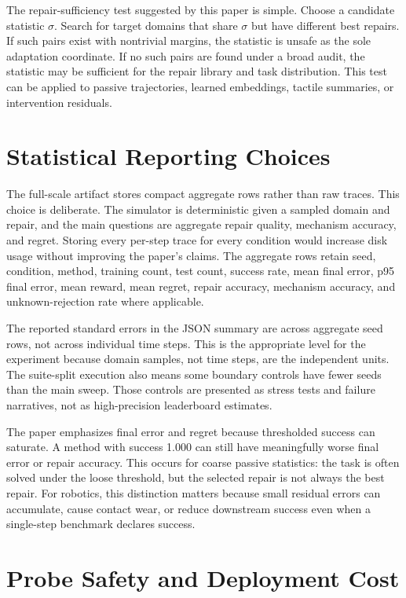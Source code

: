 \documentclass{article}
\begin{document}
The repair-sufficiency test suggested by this paper is simple. Choose a
candidate statistic $\sigma$. Search for target domains that share $\sigma$ but
have different best repairs. If such pairs exist with nontrivial margins, the
statistic is unsafe as the sole adaptation coordinate. If no such pairs are
found under a broad audit, the statistic may be sufficient for the repair
library and task distribution. This test can be applied to passive trajectories,
learned embeddings, tactile summaries, or intervention residuals.

\section{Statistical Reporting Choices}

The full-scale artifact stores compact aggregate rows rather than raw traces.
This choice is deliberate. The simulator is deterministic given a sampled domain
and repair, and the main questions are aggregate repair quality, mechanism
accuracy, and regret. Storing every per-step trace for every condition would
increase disk usage without improving the paper's claims. The aggregate rows
retain seed, condition, method, training count, test count, success rate, mean
final error, p95 final error, mean reward, mean regret, repair accuracy,
mechanism accuracy, and unknown-rejection rate where applicable.

The reported standard errors in the JSON summary are across aggregate seed rows,
not across individual time steps. This is the appropriate level for the
experiment because domain samples, not time steps, are the independent units.
The suite-split execution also means some boundary controls have fewer seeds
than the main sweep. Those controls are presented as stress tests and failure
narratives, not as high-precision leaderboard estimates.

The paper emphasizes final error and regret because thresholded success can
saturate. A method with success 1.000 can still have meaningfully worse final
error or repair accuracy. This occurs for coarse passive statistics: the task is
often solved under the loose threshold, but the selected repair is not always
the best repair. For robotics, this distinction matters because small residual
errors can accumulate, cause contact wear, or reduce downstream success even
when a single-step benchmark declares success.

\section{Probe Safety and Deployment Cost}
\end{document}
